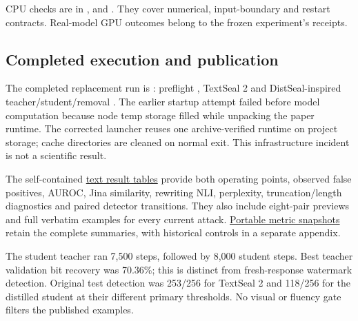 CPU checks are in
\texttt{},
\texttt{} and
\texttt{}. They cover numerical,
input-boundary and restart contracts. Real-model GPU outcomes belong to
the frozen experiment's receipts.

\subsection{Completed execution and
publication}\label{record-docs-instruct-watermarking-md-completed-execution-and-publication}

The completed replacement run is
\texttt{}: preflight
\texttt{}, TextSeal 2 \texttt{} and
DistSeal-inspired teacher/student/removal \texttt{}.
The earlier startup attempt failed before model computation because node
temp storage filled while unpacking the paper runtime. The corrected
launcher reuses one archive-verified runtime on project storage; cache
directories are cleaned on normal exit. This infrastructure incident is
not a scientific result.

The self-contained \href{records/docs/watermarking/text.tex}{text result
tables} provide both operating points, observed false positives, AUROC,
Jina similarity, rewriting NLI, perplexity, truncation/length
diagnostics and paired detector transitions. They also include
eight-pair previews and full verbatim examples for every current attack.
\href{../docs/watermarking/data/metrics.json}{Portable metric snapshots}
retain the complete summaries, with historical controls in a separate
appendix.

The student teacher ran 7,500 steps, followed by 8,000 student steps.
Best teacher validation bit recovery was 70.36\%; this is distinct from
fresh-response watermark detection. Original test detection was 253/256
for TextSeal 2 and 118/256 for the distilled student at their different
primary thresholds. No visual or fluency gate filters the published
examples.
